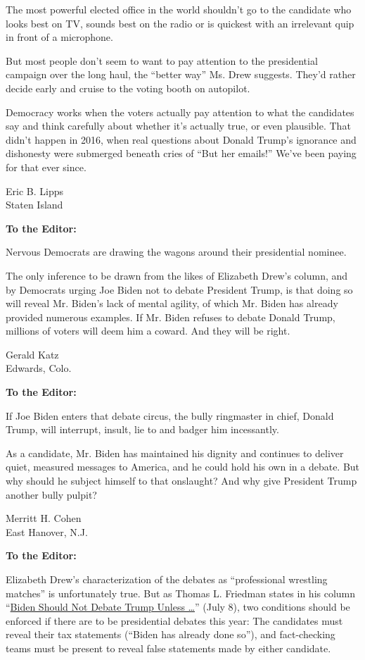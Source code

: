 The most powerful elected office in the world shouldn't go to the
candidate who looks best on TV, sounds best on the radio or is quickest
with an irrelevant quip in front of a microphone.

But most people don't seem to want to pay attention to the presidential
campaign over the long haul, the ``better way'' Ms. Drew suggests.
They'd rather decide early and cruise to the voting booth on autopilot.

Democracy works when the voters actually pay attention to what the
candidates say and think carefully about whether it's actually true, or
even plausible. That didn't happen in 2016, when real questions about
Donald Trump's ignorance and dishonesty were submerged beneath cries of
``But her emails!'' We've been paying for that ever since.

Eric B. Lipps\\
Staten Island

\textbf{To the Editor:}

Nervous Democrats are drawing the wagons around their presidential
nominee.

The only inference to be drawn from the likes of Elizabeth Drew's
column, and by Democrats urging Joe Biden not to debate President Trump,
is that doing so will reveal Mr. Biden's lack of mental agility, of
which Mr. Biden has already provided numerous examples. If Mr. Biden
refuses to debate Donald Trump, millions of voters will deem him a
coward. And they will be right.

Gerald Katz\\
Edwards, Colo.

\textbf{To the Editor:}

If Joe Biden enters that debate circus, the bully ringmaster in chief,
Donald Trump, will interrupt, insult, lie to and badger him incessantly.

As a candidate, Mr. Biden has maintained his dignity and continues to
deliver quiet, measured messages to America, and he could hold his own
in a debate. But why should he subject himself to that onslaught? And
why give President Trump another bully pulpit?

Merritt H. Cohen\\
East Hanover, N.J.

\textbf{To the Editor:}

Elizabeth Drew's characterization of the debates as ``professional
wrestling matches'' is unfortunately true. But as Thomas L. Friedman
states in his column
``\href{https://www.nytimes.com/2020/07/07/opinion/biden-trump-debate.html}{Biden
Should Not Debate Trump Unless \ldots{}}'' (July 8), two conditions
should be enforced if there are to be presidential debates this year:
The candidates must reveal their tax statements (``Biden has already
done so''), and fact-checking teams must be present to reveal false
statements made by either candidate.

